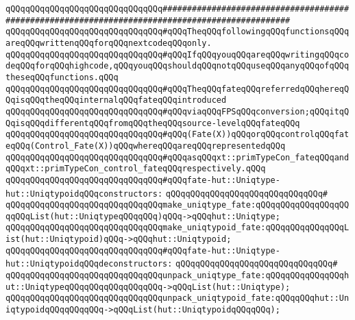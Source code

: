 \verb|qQQqqQQqqQQqqQQqqQQqqQQqqQQqqQQq################################################################################################|\newline
\verb|qQQqqQQqqQQqqQQqqQQqqQQqqQQqqQQq#qQQqTheqQQqfollowingqQQqfunctionsqQQqareqQQqwrittenqQQqforqQQqnextcodeqQQqonly.|\newline
\verb|qQQqqQQqqQQqqQQqqQQqqQQqqQQqqQQq#qQQqIfqQQqyouqQQqareqQQqwritingqQQqcodeqQQqforqQQqhighcode,qQQqyouqQQqshouldqQQqnotqQQquseqQQqanyqQQqofqQQqtheseqQQqfunctions.qQQq|\newline
\verb|qQQqqQQqqQQqqQQqqQQqqQQqqQQqqQQq#qQQqTheqQQqfateqQQqreferredqQQqhereqQQqisqQQqtheqQQqinternalqQQqfateqQQqintroduced|\newline
\verb|qQQqqQQqqQQqqQQqqQQqqQQqqQQqqQQq#qQQqviaqQQqFPSqQQqconversion;qQQqitqQQqisqQQqdifferentqQQqfromqQQqtheqQQqsource-levelqQQqfateqQQq|\newline
\verb|qQQqqQQqqQQqqQQqqQQqqQQqqQQqqQQq#qQQq(Fate(X))qQQqorqQQqcontrolqQQqfateqQQq(Control_Fate(X))qQQqwhereqQQqareqQQqrepresentedqQQq|\newline
\verb|qQQqqQQqqQQqqQQqqQQqqQQqqQQqqQQq#qQQqasqQQqxt::primTypeCon_fateqQQqandqQQqxt::primTypeCon_control_fateqQQqrespectively.qQQq|\newline
\newline
\newline
\verb|qQQqqQQqqQQqqQQqqQQqqQQqqQQqqQQq#qQQqfate-hut::Uniqtype-hut::UniqtypoidqQQqconstructors:|\newline
\verb|qQQqqQQqqQQqqQQqqQQqqQQqqQQqqQQq#|\newline
\verb|qQQqqQQqqQQqqQQqqQQqqQQqqQQqqQQqmake_uniqtype_fate:qQQqqQQqqQQqqQQqqQQqqQQqList(hut::UniqtypeqQQqqQQq)qQQq->qQQqhut::Uniqtype;|\newline
\verb|qQQqqQQqqQQqqQQqqQQqqQQqqQQqqQQqmake_uniqtypoid_fate:qQQqqQQqqQQqqQQqList(hut::Uniqtypoid)qQQq->qQQqhut::Uniqtypoid;|\newline
\newline
\verb|qQQqqQQqqQQqqQQqqQQqqQQqqQQqqQQq#qQQqfate-hut::Uniqtype-hut::UniqtypoidqQQqdeconstructors:|\newline
\verb|qQQqqQQqqQQqqQQqqQQqqQQqqQQqqQQq#|\newline
\verb|qQQqqQQqqQQqqQQqqQQqqQQqqQQqqQQqunpack_uniqtype_fate:qQQqqQQqqQQqqQQqhut::UniqtypeqQQqqQQqqQQqqQQqqQQq->qQQqList(hut::Uniqtype);|\newline
\verb|qQQqqQQqqQQqqQQqqQQqqQQqqQQqqQQqunpack_uniqtypoid_fate:qQQqqQQqhut::UniqtypoidqQQqqQQqqQQq->qQQqList(hut::UniqtypoidqQQqqQQq);|\newline
